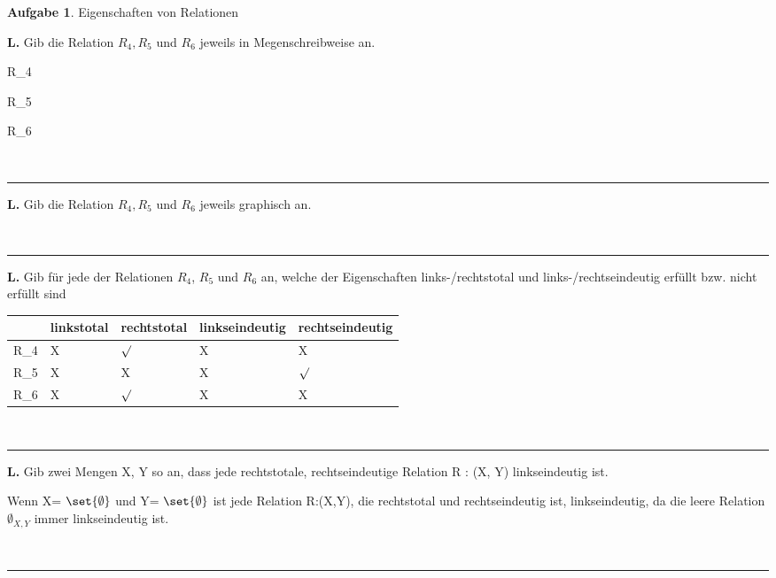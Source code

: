 \documentclass[10pt,leqno ]{article}
\DeclarePairedDelimiter\set\{\}
\theoremstyle{definition}
\newtheorem{problem}[theorem]{Aufgabe}
\newenvironment{solution}[1][L]{\begin{doublespace}\textbf{#1.}\quad }{\ \rule{0.5em}{0.5em}\end{doublespace}}
\begin{document}
\begin{problem}
    Eigenschaften von Relationen
\end{problem}

\begin{solution}
   Gib die Relation \(R_4, R_5\) und \(R_6\) jeweils in Megenschreibweise an.
   
   R_4 \triangleq {}
   
   R_5 \triangleq {}
   
   R_6 \triangleq {}
   
   
\end{solution}
\begin{solution}
   Gib die Relation \(R_4, R_5\) und \(R_6\) jeweils graphisch an.
   
\end{solution}
\begin{solution}
   Gib für jede der Relationen \(R_4\), \(R_5\) und \(R_6\) an, welche der Eigenschaften links-/rechtstotal
   und links-/rechtseindeutig erfüllt bzw. nicht erfüllt sind
   
   \begin{tabular}{|p{1cm}|p{3cm}|p{3cm}|p{3cm}|p{3cm}|}
     \hline

        & linkstotal & rechtstotal& linkseindeutig& rechtseindeutig\\
       
        
        
        
     \hline
       R_4 & X &  \(\surd \) & X & X \\
     \hline
       R_5 & X  & X & X&  \(\surd \) \\
     \hline
       R_6 & X &  \(\surd \) & X & X \\
     \hline
   \end{tabular}
   
\end{solution}
\begin{solution}  
Gib zwei Mengen X, Y so an, dass jede rechtstotale, rechtseindeutige Relation R : (X, Y)
linkseindeutig ist.
   
   Wenn 
   X= \(\set {\emptyset} \)
   und Y= \(\set {\emptyset}\)
   ist jede Relation R:(X,Y), die rechtstotal und rechtseindeutig ist, linkseindeutig, da die leere Relation \(\emptyset_{X,Y}\) immer linkseindeutig ist.

   
\end{solution}
\end{document}
